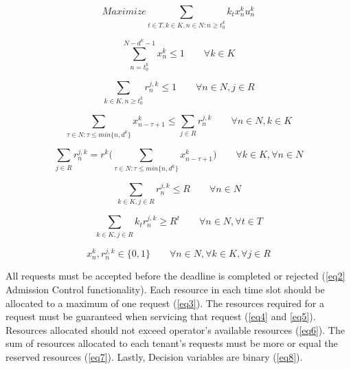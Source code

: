 \documentclass[conference]{IEEEtran}
\begin{document}
\begin{equation}
Maximize  \sum_{t \in T, k \in K, n \in N: n \geq t_{0}^{k}} k_{t} x_{n}^{k} u_{n}^{k}
\label{eq1}
\end{equation}

\begin{equation}
\sum_{n=t_{0}^{k}}^{N-{d^k}-1} x_{n}^{k} \leq 1 \qquad \forall k \in K\label{eq2}
\end{equation}

\begin{equation}
\sum_{k \in K, n \geq {t_{0}^{k}}} r_{n}^{j,k} \leq 1 \qquad \forall n \in N, j \in R
\label{eq3}
\end{equation}

\begin{equation}
\sum_{ \tau  \in N: \tau  \leq min  \big\{{n, d^{k}}\big\}} x_{n-\tau+1}^{k} \leq \sum_{j \in R} r_{n}^{j,k} \qquad	\forall n \in N, k \in K\label{eq4}
\end{equation}

\begin{equation}
\sum_{j \in R} r_{n}^{j,k} = {r^k}  \big( \sum_{\tau \in N: \tau  \leq min  \big\{{n, d^{k}}\big\}} x_{n-\tau+1}^{k}  \big) \qquad	 \forall k \in K, \forall n \in N\label{eq5}
\end{equation}

\begin{equation}
\sum_{k \in K, j \in R} r_{n}^{j,k}  \leq R  \qquad \forall n \in N\label{eq6}
\end{equation}

\begin{equation}
\sum_{k \in K, j \in R} k_t r_{n}^{j,k}   \geq  R^t  \qquad	 \forall n \in N, \forall t \in T\label{eq7}
\end{equation}

\begin{equation}
x_{n}^{k}, r_{n}^{j,k}  \in  \big\{0, 1\big\} \qquad \forall n \in N, \forall k \in K, \forall j \in R\label{eq8} \end{equation}

All requests must be accepted before the deadline is completed or rejected (\ref{eq2} Admission Control functionality). Each resource in each time slot should be allocated to a maximum of one request (\ref{eq3}). The resources required for a request must be guaranteed when servicing that request (\ref{eq4} and \ref{eq5}). Resources allocated should not exceed operator's available resources (\ref{eq6}). The sum of resources allocated to each tenant's requests must be more or equal the reserved resources (\ref{eq7}). Lastly, Decision variables are binary (\ref{eq8}).
\end{document}
